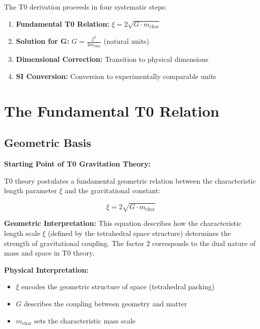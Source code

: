 \documentclass[12pt,a4paper]{article}
\begin{document}
	The T0 derivation proceeds in four systematic steps:
	
	\begin{enumerate}
		\item \textbf{Fundamental T0 Relation:} $\xi = 2\sqrt{G \cdot m_{\text{char}}}$
		\item \textbf{Solution for G:} $G = \frac{\xi^2}{4m_{\text{char}}}$ (natural units)
		\item \textbf{Dimensional Correction:} Transition to physical dimensions
		\item \textbf{SI Conversion:} Conversion to experimentally comparable units
	\end{enumerate}
	
	\section{The Fundamental T0 Relation}
	
	\subsection{Geometric Basis}
	
	\begin{derivation}
		\textbf{Starting Point of T0 Gravitation Theory:}
		
		T0 theory postulates a fundamental geometric relation between the characteristic length parameter $\xi$ and the gravitational constant:
		
		\begin{equation}
			\xi = 2\sqrt{G \cdot m_{\text{char}}}
			\label{eq:t0_fundamental}
		\end{equation}
		
		\textbf{Geometric Interpretation:} 
		This equation describes how the characteristic length scale $\xi$ (defined by the tetrahedral space structure) determines the strength of gravitational coupling. The factor 2 corresponds to the dual nature of mass and space in T0 theory.
		
		\textbf{Physical Interpretation:}
		\begin{itemize}
			\item $\xi$ encodes the geometric structure of space (tetrahedral packing)
			\item $G$ describes the coupling between geometry and matter  
			\item $m_{\text{char}}$ sets the characteristic mass scale
		\end{itemize}
	\end{derivation}
	
\end{document}
